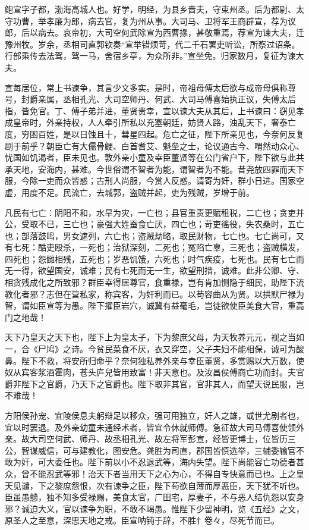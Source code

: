 \documentclass[12pt,UTF8]{ctexbook}
\begin{document}
鲍宣字子都，渤海高城人也。好学，明经，为县乡啬夫，守束州丞。后为都尉、太守功曹，举孝廉为郎，病去官，复为州从事。大司马、卫将军王商辟宣，荐为议郎，后以病去。哀帝初，大司空何武除宣为西曹掾，甚敬重焉，荐宣为谏大夫，迁豫州牧。岁余，丞相司直郭钦奏“宣举错烦苛，代二千石署吏听讼，所察过诏条。行部乘传去法驾，驾一马，舍宿乡亭，为众所非。”宣坐免。归家数月，复征为谏大夫。



宣每居位，常上书谏争，其言少文多实。是时，帝祖母傅太后欲与成帝母俱称尊号，封爵亲属，丞相孔光、大司空师丹、何武、大司马傅喜始执正议，失傅太后指，皆免官。丁、傅子弟并进，董贤贵幸，宣以谏大夫从其后，上书谏曰：窃见孝成皇帝时，外亲持权，人人牵引所私以充塞朝廷，妨贤人路，浊乱天下，奢泰亡度，穷困百姓，是以日蚀且十，彗星四起。危亡之征，陛下所亲见也，今奈何反复剧于前乎？朝臣亡有大儒骨鲠、白首耆艾、魁垒之士，论议通古今、喟然动众心、忧国如饥渴者，臣未见也。敦外亲小童及幸臣董贤等在公门省户下，陛下欲与此共承天地，安海内，甚难。今世俗谓不智者为能，谓智者为不能。昔尧放四罪而天下服，今除一吏而众皆惑；古刑人尚服，今赏人反惑。请寄为奸，群小日进。国家空虚，用度不足。民流亡，去城郭，盗贼并起，吏为残贼，岁增于前。



凡民有七亡：阴阳不和，水旱为灾，一亡也；县官重责更赋租税，二亡也；贪吏并公，受取不已，三亡也；豪强大姓蚕食亡厌，四亡也；苛吏徭役，失农桑时，五亡也；部落鼓鸣，男女遮列，六亡也；盗贼劫略，取民财物，七亡也。七亡尚可，又有七死：酷吏殴杀，一死也；治狱深刻，二死也；冤陷亡辜，三死也；盗贼横发，四死也；怨雠相残，五死也；岁恶饥饿，六死也；时气疾疫，七死也。民有七亡而无一得，欲望国安，诚难；民有七死而无一生，欲望刑措，诚难。此非公卿、守、相贪残成化之所致邪？群臣幸得居尊官，食重禄，岂有肯加恻隐于细民，助陛下流教化者邪？志但在营私家，称宾客，为奸利而已。以苟容曲从为贤。以拱默尸禄为智，谓如臣宣等为愚。陛下擢臣岩穴，诚冀有益毫毛，岂徒欲使臣美食大官，重高门之地哉！



天下乃皇天之天下也，陛下上为皇太子，下为黎庶父母，为天牧养元元，视之当如一，合《尸鸠》之诗。今贫民菜食不厌，衣又穿空，父子夫妇不能相保，诚可为酸鼻。陛下不救，将安所归命乎？奈何独私养外亲与幸臣董贤，多赏赐以大万数，使奴从宾客浆酒霍肉，苍头庐兒皆用致富！非天意也。及汝昌侯傅商亡功而封。夫官爵非陛下之官爵，乃天下之官爵也。陛下取非其官，官非其人，而望天说民服，岂不难哉！



方阳侯孙宠、宜陵侯息夫躬辩足以移众，强可用独立，奸人之雄，或世尤剧者也，宜以时罢退。及外亲幼童未通经术者，皆宜令休就师傅。急征故大司马傅喜使领外亲。故大司空何武、师丹、故丞相孔光、故左将军彭宣，经皆更博士，位皆历三公，智谋威信，可与建教化，图安危。龚胜为司直，郡国皆慎选举，三辅委输官不敢为奸，可大委任也。陛下前以小不忍退武等，海内失望。陛下尚能容亡功德者甚众，曾不能忍武等邪！治天下者当用天下之心为心，不得自专快意而已也。上之皇天见谴，下之黎庶怨恨，次有谏争之臣，陛下苟欲自薄而厚恶臣，天下犹不听也。臣虽愚戆，独不知多受禄赐，美食太官，广田宅，厚妻子，不与恶人结仇怨以安身邪？诚迫大义，官以谏争为职，不敢不竭愚。惟陛下少留神明，览《五经》之文，原圣人之至意，深思天地之戒。臣宣呐钝于辞，不胜忄卷々，尽死节而已。
\end{document}
